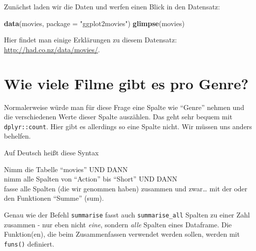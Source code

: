 \documentclass[12pt,ngerman,]{book}
\makeatletter
\newenvironment{Shaded}{\begin{snugshade}}{\end{snugshade}}
\newcommand{\KeywordTok}[1]{\textcolor[rgb]{0.13,0.29,0.53}{\textbf{#1}}}
\newcommand{\DataTypeTok}[1]{\textcolor[rgb]{0.13,0.29,0.53}{#1}}
\newcommand{\StringTok}[1]{\textcolor[rgb]{0.31,0.60,0.02}{#1}}
\newcommand{\CommentTok}[1]{\textcolor[rgb]{0.56,0.35,0.01}{\textit{#1}}}
\newcommand{\OperatorTok}[1]{\textcolor[rgb]{0.81,0.36,0.00}{\textbf{#1}}}
\newcommand{\NormalTok}[1]{#1}
\newenvironment{kframe}{%
\medskip{}
\setlength{\fboxsep}{.8em}
 \def\at@end@of@kframe{}%
 \ifinner\ifhmode%
  \def\at@end@of@kframe{\end{minipage}}%
  \begin{minipage}{\columnwidth}%
 \fi\fi%
 \def\FrameCommand##1{\hskip\@totalleftmargin \hskip-\fboxsep
 \colorbox{shadecolor}{##1}\hskip-\fboxsep
     \hskip-\linewidth \hskip-\@totalleftmargin \hskip\columnwidth}%
 \MakeFramed {\advance\hsize-\width
   \@totalleftmargin\z@ \linewidth\hsize
   \@setminipage}}%
 {\par\unskip\endMakeFramed%
 \at@end@of@kframe}
\renewenvironment{Shaded}{\begin{kframe}}{\end{kframe}}
\theoremstyle{definition}
\theoremstyle{definition}
\theoremstyle{remark}
\let\BeginKnitrBlock\begin \let\EndKnitrBlock\end
\makeatother
\begin{document}
Zunächst laden wir die Daten und werfen einen Blick in den Datensatz:

\begin{Shaded}
\begin{Highlighting}[]
\KeywordTok{data}\NormalTok{(movies, }\DataTypeTok{package =} \StringTok{"ggplot2movies"}\NormalTok{)}
\KeywordTok{glimpse}\NormalTok{(movies)}
\end{Highlighting}
\end{Shaded}

Hier findet man einige Erklärungen zu diesem Datensatz:
\url{http://had.co.nz/data/movies/}.

\section{Wie viele Filme gibt es pro
Genre?}\label{wie-viele-filme-gibt-es-pro-genre}

Normalerweise würde man für diese Frage eine Spalte wie ``Genre'' nehmen
und die verschiedenen Werte dieser Spalte auszählen. Das geht sehr
bequem mit \texttt{dplyr::count}. Hier gibt es allerdings so eine Spalte
nicht. Wir müssen uns anders behelfen.

\begin{Shaded}
\end{Shaded}

Auf Deutsch heißt diese Syntax

\BeginKnitrBlock{rmdpseudocode}
Nimm die Tabelle ``movies'' UND DANN\\
nimm alle Spalten von ``Action'' bis ``Short'' UND DANN\\
fasse alle Spalten (die wir genommen haben) zusammen und zwar\ldots{}
mit der oder den Funktionen ``Summe'' (sum).
\EndKnitrBlock{rmdpseudocode}

Genau wie der Befehl \texttt{summarise} fasst auch
\texttt{summarise\_all} Spalten zu einer Zahl zusammen - nur eben nicht
\emph{eine}, sondern \emph{alle} Spalten eines Dataframe. Die
Funktion(en), die beim Zusammenfassen verwendet werden sollen, werden
mit \texttt{funs()} definiert.
\end{document}
